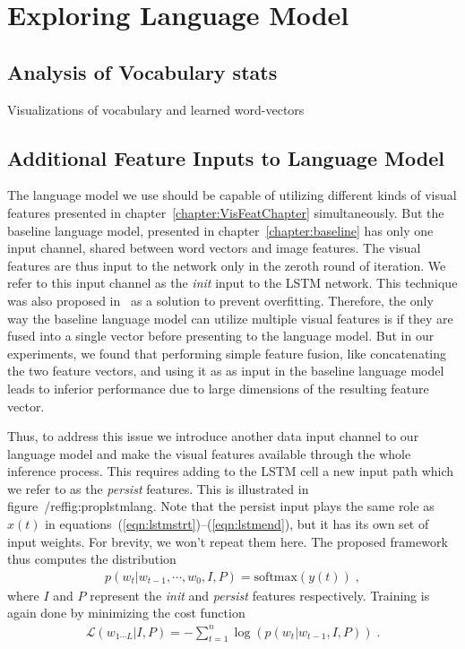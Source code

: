 \chapter{Exploring Language Model}
\label{chapter:langModel}
\section{Analysis of Vocabulary stats}
Visualizations of vocabulary and learned word-vectors

\section{Additional Feature Inputs to Language Model}
The language model we use should be capable of utilizing different kinds of
visual features presented in chapter~\ref{chapter:VisFeatChapter}
simultaneously.
But the baseline language model, presented in chapter~\ref{chapter:baseline} has
only one input channel, shared between word vectors and image features.
The visual features are thus input to the network only in the zeroth
round of iteration.
We refer to this input channel as the \emph{init} input to the LSTM network.
This technique was also proposed in~\cite{Vinyals_2015_CVPR} as a solution to
prevent overfitting. 
Therefore, the only way the baseline language model can utilize multiple visual
features is if they are fused into a single vector before presenting to the
language model.
But in our experiments, we found that performing simple feature fusion, like
concatenating the two feature vectors, and using it as as input in the baseline
language model leads to inferior performance due to large dimensions of the
resulting feature vector.

Thus, to address this issue we introduce another data input channel to our
language model and make the visual features available through the whole
inference process.
This requires adding to the LSTM cell a new input path which we refer to as the
\emph{persist} features.
This is illustrated in figure~/ref{fig:proplstmlang}.
Note that the persist input plays the same role as $x(t)$ in
equations~(\ref{eqn:lstmstrt})--(\ref{eqn:lstmend}), but it has its own set of
input weights.
For brevity, we won't repeat them here.
The proposed framework thus computes the distribution
\begin{align}
p(w_t | w_{t-1},\cdots,w_0, I, P) = \text{softmax}(y(t)) \;,
\end{align}
\noindent where $I$ and $P$ represent the \emph{init} and \emph{persist}
features respectively.
Training is again done by minimizing the cost function
\begin{align}
  \mathcal{L}(w_{1\cdots L} | I,P) = -\sum_{t=1}^n \log(p(w_t|w_{t-1},I,P)) \; .
\end{align}


